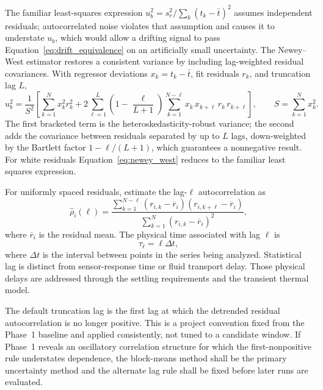 \documentclass[11pt]{article}
\begin{document}
The familiar least-squares expression $u_b^2=s_r^2/\sum_k(t_k-\bar t)^2$ assumes
independent residuals; autocorrelated noise violates that assumption and
causes it to understate $u_b$, which would allow a drifting signal to pass
Equation~\eqref{eq:drift_equivalence} on an artificially small uncertainty.
The Newey--West estimator restores a consistent variance by including
lag-weighted residual covariances\cite{neweywest1987}. With regressor deviations
$x_k=t_k-\bar t$, fit residuals $r_k$, and truncation lag $L$,
\begin{equation}
    u_b^2
    =
    \frac{1}{S^2}
    \left[
        \sum_{k=1}^{N} x_k^2 r_k^2
        +
        2\sum_{\ell=1}^{L}
        \left(1-\frac{\ell}{L+1}\right)
        \sum_{k=1}^{N-\ell}
        x_k\,x_{k+\ell}\,r_k\,r_{k+\ell}
    \right],
    \qquad
    S=\sum_{k=1}^{N} x_k^2.
    \label{eq:newey_west}
\end{equation}
The first bracketed term is the heteroskedasticity-robust variance; the
second adds the covariance between residuals separated by up to $L$ lags,
down-weighted by the Bartlett factor $1-\ell/(L+1)$, which guarantees a
nonnegative result. For white residuals Equation~\eqref{eq:newey_west}
reduces to the familiar least squares expression.

For uniformly spaced residuals, estimate the lag-$\ell$ autocorrelation as
\begin{equation}
    \widehat{\rho}_i(\ell)
    =
    \frac{
    \displaystyle
    \sum_{k=1}^{N-\ell}
    \left(r_{i,k}-\overline r_i\right)
    \left(r_{i,k+\ell}-\overline r_i\right)
    }
    {
    \displaystyle
    \sum_{k=1}^{N}
    \left(r_{i,k}-\overline r_i\right)^2
    },
    \label{eq:sample_autocorrelation}
\end{equation}
where $\overline r_i$ is the residual mean. The physical time associated with lag $\ell$ is
\begin{equation}
    \tau_{\ell}
    =
    \ell\Delta t,
\end{equation}
where $\Delta t$ is the interval between points in the series being analyzed. Statistical lag is distinct from sensor-response time or fluid transport delay. Those physical delays are addressed through the settling requirements and the transient thermal model.
 
The default truncation lag is the first lag at which the detrended residual autocorrelation is no longer positive. This is a project convention fixed from the Phase~1 baseline and applied consistently, not tuned to a candidate window. If Phase~1 reveals an oscillatory correlation structure for which the first-nonpositive rule understates dependence, the block-means method shall be the primary uncertainty method and the alternate lag rule shall be fixed before later runs are evaluated.
\end{document}
